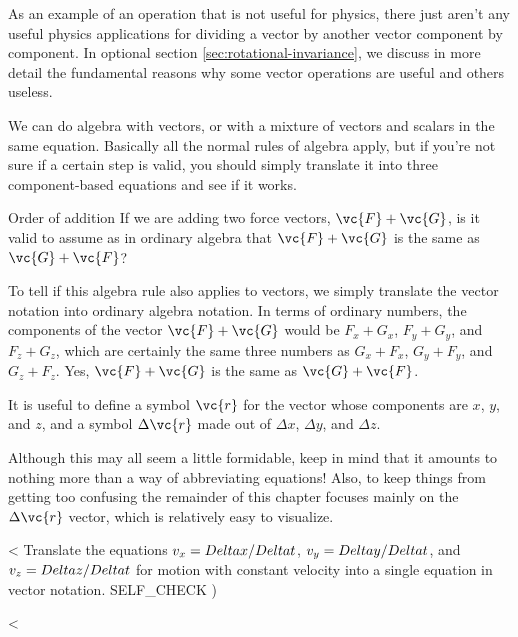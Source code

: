 As an example of an operation that is not useful for
physics, there just aren't any useful physics applications
for dividing a vector by another vector component by
component. In optional section \ref{sec:rotational-invariance}, we discuss in more
detail the fundamental reasons why some vector operations
are useful and others useless.

We can do algebra with vectors, or with a mixture of vectors
and scalars in the same equation. Basically all the normal
rules of algebra apply, but if you're not sure if a certain
step is valid, you should simply translate it into three
component-based equations and see if it works.

\begin{eg}{Order of addition}
\egquestion If we are adding two force vectors, $\vc{F}+\vc{G}$, is it
valid to assume as in ordinary algebra that $\vc{F}+\vc{G}$ is the same as $\vc{G}+\vc{F}$?

\eganswer To tell if this algebra rule also applies to
vectors, we simply translate the vector notation into
ordinary algebra notation. In terms of ordinary numbers, the
components of the vector $\vc{F}+\vc{G}$ would be $F_x+G_x$, $F_y+G_y$,
and $F_z+G_z$, which are certainly the same three numbers as
$G_x+F_x$, $G_y+F_y$, and $G_z+F_z$. Yes, $\vc{F}+\vc{G}$ is the same as $\vc{G}+\vc{F}$.
\end{eg}

It is useful to define a symbol $\vc{r}$ for the vector whose
components are $x$, $y$, and $z$, and a symbol $\Delta\vc{r}$ made
out of $\Delta x$, $\Delta y$, and $\Delta z$.

Although this may all seem a little formidable, keep in mind
that it amounts to nothing more than a way of abbreviating
equations! Also, to keep things from getting too confusing
the remainder of this chapter focuses mainly on the 
$\Delta \vc{r}$ vector, which is relatively easy to visualize.

<%
Translate the equations $v_x=\\Delta x/\\Delta t$, 
$v_y=\\Delta y/\\Delta t$, and $v_z=\\Delta z/\\Delta t$ for motion with
constant velocity into a single equation in vector notation.
  SELF_CHECK
  ) %

<%

